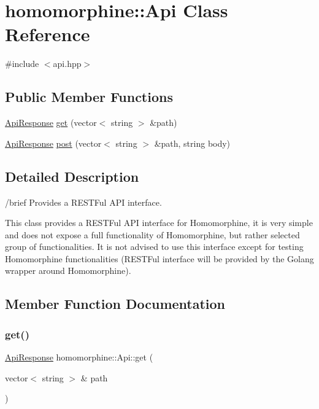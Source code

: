 \hypertarget{classhomomorphine_1_1_api}{}\section{homomorphine\+:\+:Api Class Reference}
\label{classhomomorphine_1_1_api}


{\ttfamily \#include $<$api.\+hpp$>$}

\subsection*{Public Member Functions}
\begin{DoxyCompactItemize}
\item 
\hyperlink{classhomomorphine_1_1_api_response}{Api\+Response} \hyperlink{classhomomorphine_1_1_api_aa595d352d3494870f5e5bd7262be90c2}{get} (vector$<$ string $>$ \&path)
\item 
\hyperlink{classhomomorphine_1_1_api_response}{Api\+Response} \hyperlink{classhomomorphine_1_1_api_ab538a352f9ef7e92885bdd25a2f3dedd}{post} (vector$<$ string $>$ \&path, string body)
\end{DoxyCompactItemize}


\subsection{Detailed Description}
/brief Provides a R\+E\+S\+T\+Ful A\+PI interface.

This class provides a R\+E\+S\+T\+Ful A\+PI interface for Homomorphine, it is very simple and does not expose a full functionality of Homomorphine, but rather selected group of functionalities. It is not advised to use this interface except for testing Homomorphine functionalities (R\+E\+S\+T\+Ful interface will be provided by the Golang wrapper around Homomorphine). 

\subsection{Member Function Documentation}
\mbox{\label{classhomomorphine_1_1_api_aa595d352d3494870f5e5bd7262be90c2}} 
\subsubsection{\texorpdfstring{get()}{get()}}
{\footnotesize\ttfamily \hyperlink{classhomomorphine_1_1_api_response}{Api\+Response} homomorphine\+::\+Api\+::get (\begin{DoxyParamCaption}\item[{vector$<$ string $>$ \&}]{path }\end{DoxyParamCaption})}

